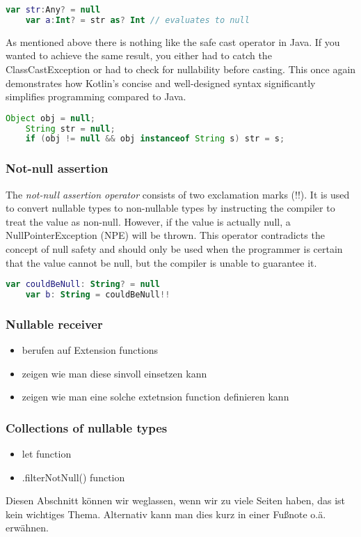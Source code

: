 \documentclass[a4paper, 11pt]{article}
\begin{document}
  \begin{lstlisting}[language=Kotlin,title={Usage of the safe cast operator on a nullable value}]
    var str:Any? = null
    var a:Int? = str as? Int // evaluates to null
  \end{lstlisting}
    As mentioned above there is nothing like the safe cast operator in Java. If you wanted to achieve the same result, you either had to catch the ClassCastException or  had to check for nullability before casting. This once again demonstrates how Kotlin's concise and well-designed syntax significantly simplifies programming compared to Java.
  \begin{lstlisting}[language=Java,title={Functionality of safe call operator in java}]
    Object obj = null;
    String str = null;
    if (obj != null && obj instanceof String s) str = s;
  \end{lstlisting}

  \subsubsection{Not-null assertion}
    The \textit{not-null assertion operator} consists of two exclamation marks (!!). It is used to convert nullable types to non-nullable types by instructing the compiler to treat the value as non-null. However, if the value is actually null, a NullPointerException (NPE) will be thrown. This operator contradicts the concept of null safety and should only be used when the programmer is certain that the value cannot be null, but the compiler is unable to guarantee it.
  \begin{lstlisting}[language=Kotlin,title={Usage of the not-null assertion}]
    var couldBeNull: String? = null
    var b: String = couldBeNull!!
  \end{lstlisting}

  \subsubsection{Nullable receiver}
  \begin{itemize}
    \item berufen auf Extension functions
    \item zeigen wie man diese sinvoll einsetzen kann
    \item zeigen wie man eine solche extetnsion function definieren kann
  \end{itemize}

  \subsubsection{Collections of nullable types}
  \begin{itemize}
    \item let function
    \item .filterNotNull() function
  \end{itemize}
  Diesen Abschnitt können wir weglassen, wenn wir zu viele Seiten haben, das ist kein wichtiges Thema. Alternativ kann man dies kurz in einer Fußnote o.ä. erwähnen.
\end{document}

